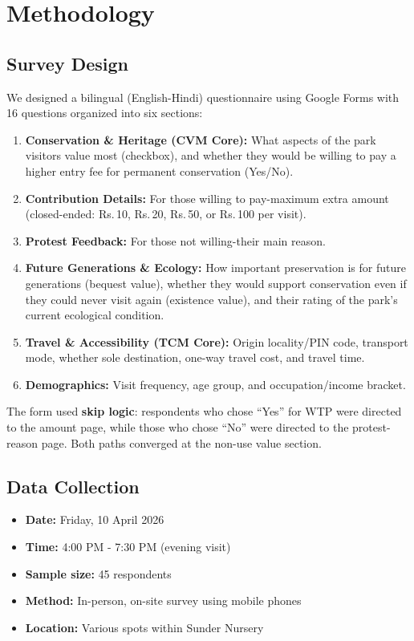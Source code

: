 \documentclass[12pt, a4paper]{article}
\newcommand{\rupee}{\textrm{Rs.}\,}
\begin{document}
\section{Methodology}

\subsection{Survey Design}

We designed a bilingual (English-Hindi) questionnaire using Google Forms with 16 questions organized into six sections:

\begin{enumerate}[nosep]
    \item \textbf{Conservation \& Heritage (CVM Core):} What aspects of the park visitors value most (checkbox), and whether they would be willing to pay a higher entry fee for permanent conservation (Yes/No).
    \item \textbf{Contribution Details:} For those willing to pay-maximum extra amount (closed-ended: \rupee 10, \rupee 20, \rupee 50, or \rupee 100 per visit).
    \item \textbf{Protest Feedback:} For those not willing-their main reason.
    \item \textbf{Future Generations \& Ecology:} How important preservation is for future generations (bequest value), whether they would support conservation even if they could never visit again (existence value), and their rating of the park's current ecological condition.
    \item \textbf{Travel \& Accessibility (TCM Core):} Origin locality/PIN code, transport mode, whether sole destination, one-way travel cost, and travel time.
    \item \textbf{Demographics:} Visit frequency, age group, and occupation/income bracket.
\end{enumerate}

The form used \textbf{skip logic}: respondents who chose ``Yes'' for WTP were directed to the amount page, while those who chose ``No'' were directed to the protest-reason page. Both paths converged at the non-use value section.

\subsection{Data Collection}

\begin{itemize}[nosep]
    \item \textbf{Date:} Friday, 10 April 2026
    \item \textbf{Time:} 4:00 PM - 7:30 PM (evening visit)
    \item \textbf{Sample size:} 45 respondents
    \item \textbf{Method:} In-person, on-site survey using mobile phones
    \item \textbf{Location:} Various spots within Sunder Nursery
\end{itemize}
\end{document}
